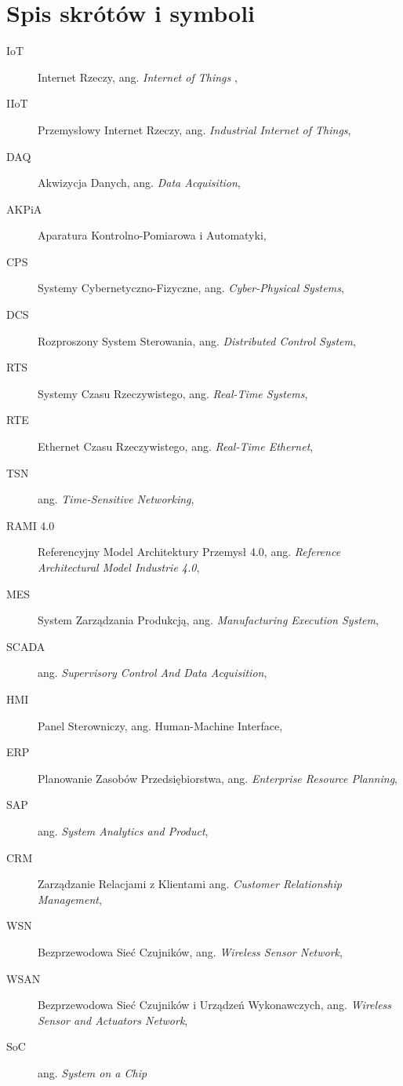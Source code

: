\documentclass[a4paper, 12pt, twoside]{article}
\begin{document}
\newpage
\pagestyle{skroty}
\section*{Spis skrótów i symboli}

\begin{description}
      \item[IoT] Internet Rzeczy, ang. \emph{Internet of Things} ,
      \item[IIoT] Przemysłowy Internet Rzeczy, ang. \emph{Industrial Internet of Things},
      \item[DAQ] Akwizycja Danych, ang. \emph{Data Acquisition},
      \item[AKPiA] Aparatura Kontrolno-Pomiarowa i Automatyki,
      \item[CPS] Systemy Cybernetyczno-Fizyczne, ang. \emph{Cyber-Physical Systems},
      \item[DCS] Rozproszony System Sterowania, ang. \emph{Distributed Control System},
      \item[RTS] Systemy Czasu Rzeczywistego, ang. \emph{Real-Time Systems},
      \item[RTE] Ethernet Czasu Rzeczywistego, ang. \emph{Real-Time Ethernet},
      \item[TSN] ang. \emph{Time-Sensitive Networking},
      \item[RAMI 4.0] Referencyjny Model Architektury Przemysł 4.0, ang. \emph{Reference Architectural Model Industrie 4.0},
      \item[MES] System Zarządzania Produkcją, ang. \emph{Manufacturing Execution System},
      \item[SCADA] ang. \emph{Supervisory Control And Data Acquisition},
      \item[HMI] Panel Sterowniczy, ang. Human-Machine Interface,
      \item[ERP] Planowanie Zasobów Przedsiębiorstwa, ang. \emph{Enterprise Resource Planning},
      \item[SAP] ang. \emph{System Analytics and Product},
      \item[CRM] Zarządzanie Relacjami z Klientami ang. \emph{Customer Relationship Management},
      \item[WSN] Bezprzewodowa Sieć Czujników, ang. \emph{Wireless Sensor Network},
      \item[WSAN] Bezprzewodowa Sieć Czujników i Urządzeń Wykonawczych, ang. \emph{Wireless Sensor and Actuators Network},
      \item[SoC] ang. \emph{System on a Chip}

\end{description}
\end{document}
